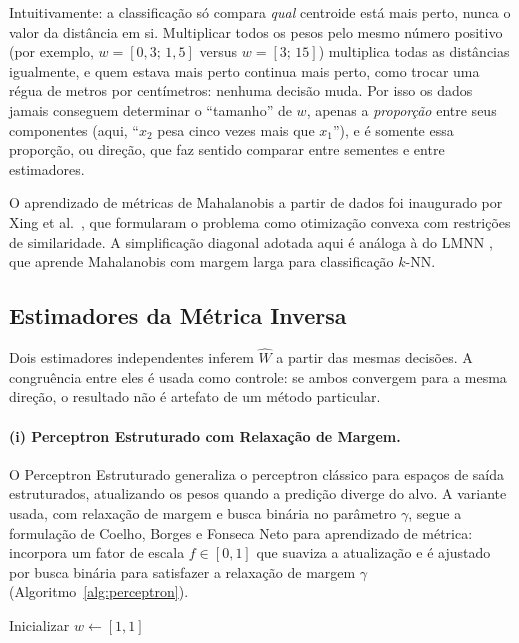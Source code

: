 \documentclass[12pt,a4paper]{article}
\newcommand{\West}{\ensuremath{\hat{W}}}   %
\begin{document}
Intuitivamente: a classificação só compara \emph{qual} centroide está mais perto, nunca o
valor da distância em si. Multiplicar todos os pesos pelo mesmo número positivo (por
exemplo, $w = [0{,}3;\,1{,}5]$ versus $w = [3;\,15]$) multiplica todas as distâncias
igualmente, e quem estava mais perto continua mais perto, como trocar uma régua de metros
por centímetros: nenhuma decisão muda. Por isso os dados jamais conseguem determinar o
``tamanho'' de $w$, apenas a \emph{proporção} entre seus componentes (aqui, ``$x_2$ pesa
cinco vezes mais que $x_1$''), e é somente essa proporção, ou direção, que faz sentido
comparar entre sementes e entre estimadores.

O aprendizado de métricas de Mahalanobis a partir de dados foi inaugurado por Xing et
al.~\cite{xingDistanceMetric2002}, que formularam o problema como otimização convexa com
restrições de similaridade. A simplificação diagonal adotada aqui é análoga à do LMNN
\cite{weinbergerDistanceMetric2009}, que
aprende Mahalanobis com margem larga para classificação $k$-NN.

\subsection{Estimadores da Métrica Inversa}

Dois estimadores independentes inferem \West{} a partir das mesmas decisões. A congruência
entre eles é usada como controle: se ambos convergem para a mesma direção, o resultado não
é artefato de um método particular.

\paragraph{(i) Perceptron Estruturado com Relaxação de Margem.}
O Perceptron Estruturado \cite{collinsDiscriminativeTraining2002} generaliza o perceptron
clássico para espaços de saída estruturados, atualizando os pesos quando a predição diverge
do alvo. A variante usada, com relaxação de margem e busca binária no parâmetro $\gamma$,
segue a formulação de Coelho, Borges e Fonseca Neto \cite{coelhoPredicaoEstruturada2017}
para aprendizado de métrica: incorpora um fator de escala $f \in [0,1]$ que suaviza a
atualização e é ajustado por busca binária para satisfazer a relaxação de margem $\gamma$
(Algoritmo~\ref{alg:perceptron}).

\begin{algorithm}[ht]
\DontPrintSemicolon
{}
Inicializar $w \leftarrow [1, 1]$\;
\caption{Perceptron Estruturado com Relaxação de Margem (variante diagonal)}
\label{alg:perceptron}
\end{algorithm}
\end{document}
